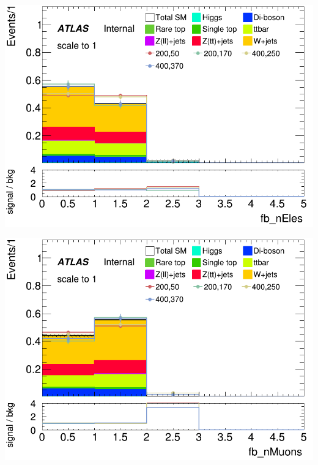 \documentclass[usenames,dvipsnames]{beamer}
\begin{document}
\begin{frame}
    \begin{minipage}{0.32\textwidth}
        \centering
        \includegraphics[width=\textwidth]{graphics/LH_met_sig/LH_fb_nEles_norm.png}
    \end{minipage}
    \hfill
    \begin{minipage}{0.32\textwidth}
        \centering
        \includegraphics[width=\textwidth]{graphics/LH_met_sig/LH_fb_nMuons_norm.png}
    \end{minipage}
    \hfill
    \begin{minipage}{0.32\textwidth}
        \centering

\end{minipage}
\end{frame}
\end{document}
